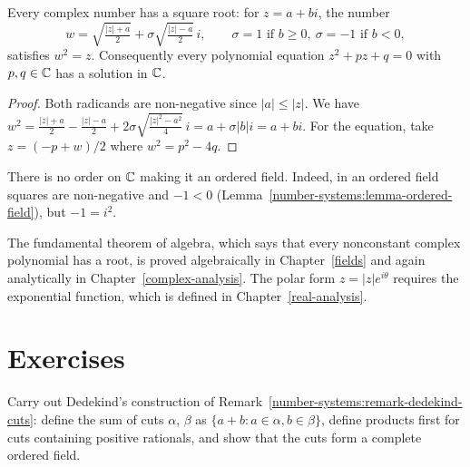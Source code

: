\begin{proposition}\label{number-systems:proposition-complex-square-roots}
Every complex number has a square root: for $z = a + bi$, the number
\[
w = \sqrt{\tfrac{|z| + a}{2}} + \sigma \sqrt{\tfrac{|z| - a}{2}}\, i,
\qquad \sigma = 1 \text{ if } b \geq 0, \ \sigma = -1 \text{ if } b < 0,
\]
satisfies $w^2 = z$. Consequently every polynomial equation $z^2 + pz + q = 0$ with
$p, q \in \mathbb{C}$ has a solution in $\mathbb{C}$.
\end{proposition}

\begin{proof}
Both radicands are non-negative since $|a| \leq |z|$. We have
$w^2 = \frac{|z| + a}{2} - \frac{|z| - a}{2} + 2\sigma\sqrt{\frac{|z|^2 - a^2}{4}}\, i
= a + \sigma |b| i = a + bi$. For the equation, take
$z = (-p + w)/2$ where $w^2 = p^2 - 4q$.
\end{proof}

\begin{counterexample}\label{number-systems:counterexample-complex-not-ordered}
There is no order on $\mathbb{C}$ making it an ordered field. Indeed, in an ordered
field squares are non-negative and $-1 < 0$
(Lemma~\ref{number-systems:lemma-ordered-field}), but $-1 = i^2$.
\end{counterexample}

\begin{remark}\label{number-systems:remark-complex-later}
The fundamental theorem of algebra, which says that every nonconstant complex
polynomial has a root, is proved algebraically in Chapter~\ref{fields} and again
analytically in Chapter~\ref{complex-analysis}. The polar form
$z = |z| e^{i\theta}$ requires the exponential function, which is defined in
Chapter~\ref{real-analysis}.
\end{remark}

\section{Exercises}\label{number-systems:section-exercises}

\begin{exercise}\label{number-systems:exercise-dedekind}
Carry out Dedekind's construction of Remark~\ref{number-systems:remark-dedekind-cuts}:
define the sum of cuts $\alpha$, $\beta$ as $\{a + b : a \in \alpha, b \in \beta\}$,
define products first for cuts containing positive rationals, and show that the
cuts form a complete ordered field.
\end{exercise}


